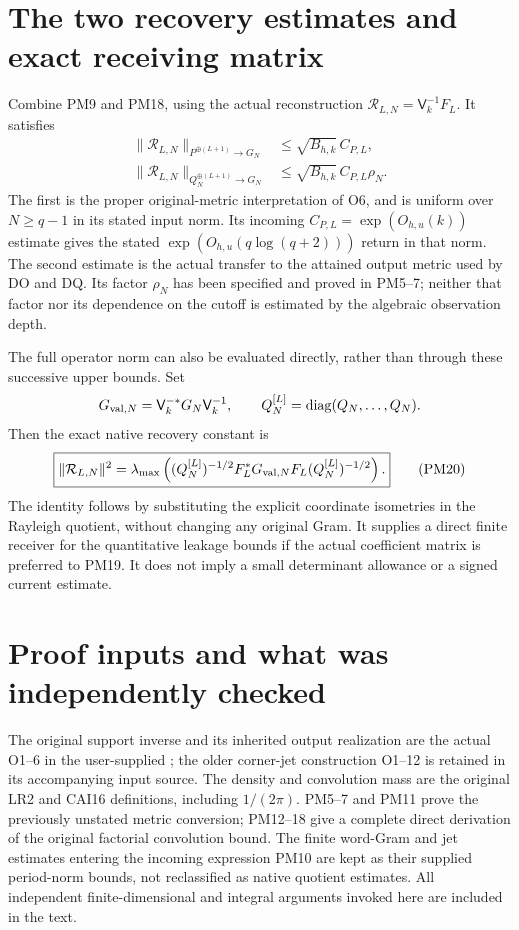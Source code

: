 \documentclass[11pt]{article}
\begin{document}
\section{The two recovery estimates and exact receiving matrix}
Combine PM9 and PM18, using the actual reconstruction
$\mathcal R_{L,N}=\mathsf V_k^{-1}F_L$.  It satisfies
\[
 \begin{split}
 \|\mathcal R_{L,N}\|_{P^{\oplus(L+1)}\to G_N}
      &\le\sqrt{B_{h,k}}\,C_{P,L},\\
 \|\mathcal R_{L,N}\|_{Q_N^{\oplus(L+1)}\to G_N}
      &\le\sqrt{B_{h,k}}\,C_{P,L}\rho_N.
 \end{split}                                                     \tag{PM19}
\]
The first is the proper original-metric interpretation of O6,
and is uniform over $N\ge q-1$ in its stated input norm.  Its
incoming $C_{P,L}=\exp(O_{h,u}(k))$ estimate gives the stated
$\exp(O_{h,u}(q\log(q+2)))$ return in that norm.  The second
estimate is the actual transfer to the attained output metric
used by DO and DQ.  Its factor $\rho_N$ has been specified and
proved in PM5--7; neither that factor nor its dependence on the
cutoff is estimated by the algebraic observation depth.

The full operator norm can also be evaluated directly, rather
than through these successive upper bounds.  Set
\[
 G_{{\rm val},N}=\mathsf V_k^{-*}G_N\mathsf V_k^{-1},\qquad
 Q_N^{[L]}=\operatorname{diag}(Q_N,\ldots,Q_N).
\]
Then the exact native recovery constant is
\[
 \boxed{\|\mathcal R_{L,N}\|^2
 =\lambda_{\max}\left((Q_N^{[L]})^{-1/2}
          F_L^*G_{{\rm val},N}F_L(Q_N^{[L]})^{-1/2}\right).}     \tag{PM20}
\]
The identity follows by substituting the explicit coordinate
isometries in the Rayleigh quotient, without changing any
original Gram.  It supplies a direct finite receiver for the
quantitative leakage bounds if the actual coefficient matrix
is preferred to PM19.  It does not imply a small determinant
allowance or a signed current estimate.

\section{Proof inputs and what was independently checked}
The original support inverse and its inherited output realization
are the actual O1--6 in the user-supplied
;
the older corner-jet construction O1--12 is retained in its
accompanying input source.  The density and convolution mass
are the original LR2 and CAI16 definitions, including $1/(2\pi)$.
PM5--7 and PM11 prove the previously unstated metric conversion;
PM12--18 give a complete direct derivation of the original
factorial convolution bound.  The finite word-Gram and jet
estimates entering the incoming expression PM10 are kept as
their supplied period-norm bounds, not reclassified as native
quotient estimates.  All independent finite-dimensional and
integral arguments invoked here are included in the text.
\end{document}
